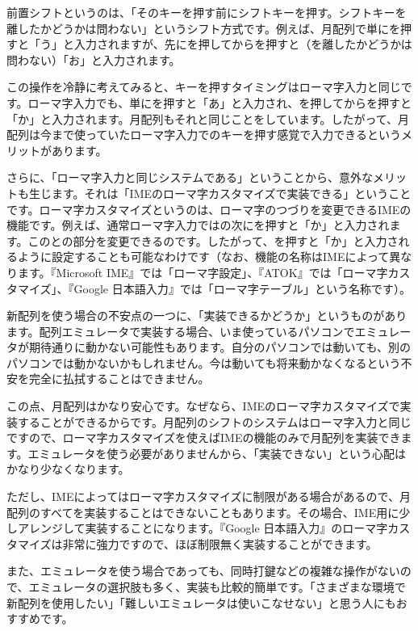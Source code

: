 前置シフトというのは、「そのキーを押す前にシフトキーを押す。シフトキーを離したかどうかは問わない」というシフト方式です。例えば、月配列で単にを押すと「う」と入力されますが、先にを押してからを押すと（を離したかどうかは問わない）「お」と入力されます。

この操作を冷静に考えてみると、キーを押すタイミングはローマ字入力と同じです。ローマ字入力でも、単にを押すと「あ」と入力され、を押してからを押すと「か」と入力されます。月配列もそれと同じことをしています。したがって、月配列は今まで使っていたローマ字入力でのキーを押す感覚で入力できるというメリットがあります。

さらに、「ローマ字入力と同じシステムである」ということから、意外なメリットも生じます。それは「IMEのローマ字カスタマイズで実装できる」ということです。ローマ字カスタマイズというのは、ローマ字のつづりを変更できるIMEの機能です。例えば、通常ローマ字入力ではの次にを押すと「か」と入力されます。このとの部分を変更できるのです。したがって、を押すと「か」と入力されるように設定することも可能なわけです（なお、機能の名称はIMEによって異なります。『Microsoft IME』では「ローマ字設定」、『ATOK』では「ローマ字カスタマイズ」、『Google 日本語入力』では「ローマ字テーブル」という名称です）。

新配列を使う場合の不安点の一つに、「実装できるかどうか」というものがあります。配列エミュレータで実装する場合、いま使っているパソコンでエミュレータが期待通りに動かない可能性もあります。自分のパソコンでは動いても、別のパソコンでは動かないかもしれません。今は動いても将来動かなくなるという不安を完全に払拭することはできません。

この点、月配列はかなり安心です。なぜなら、IMEのローマ字カスタマイズで実装することができるからです。月配列のシフトのシステムはローマ字入力と同じですので、ローマ字カスタマイズを使えばIMEの機能のみで月配列を実装できます。エミュレータを使う必要がありませんから、「実装できない」という心配はかなり少なくなります。

ただし、IMEによってはローマ字カスタマイズに制限がある場合があるので、月配列のすべてを実装することはできないこともあります。その場合、IME用に少しアレンジして実装することになります。『Google 日本語入力』のローマ字カスタマイズは非常に強力ですので、ほぼ制限無く実装することができます。

また、エミュレータを使う場合であっても、同時打鍵などの複雑な操作がないので、エミュレータの選択肢も多く、実装も比較的簡単です。「さまざまな環境で新配列を使用したい」「難しいエミュレータは使いこなせない」と思う人にもおすすめです。

